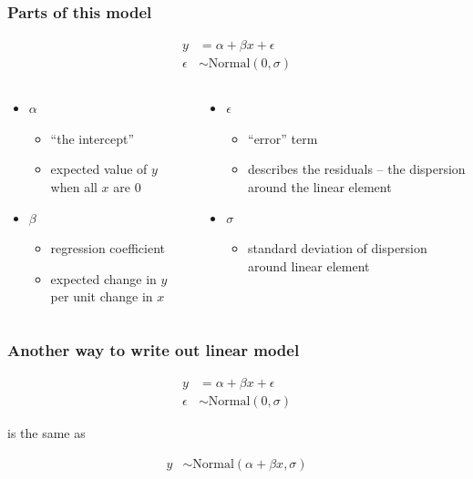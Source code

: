 \documentclass{beamer}
\begin{document}
\begin{frame}
  \frametitle{Parts of this model}

  \begin{align*}
    y &= \alpha + \beta x + \epsilon \\
    \epsilon &\sim \text{Normal}(0, \sigma)
  \end{align*}

  \begin{columns}
    \begin{column}{0.5\textwidth}
      \begin{itemize}
        \item \(\alpha\)
          \begin{itemize}
            \item ``the intercept''
            \item expected value of \(y\) when all \(x\) are 0
          \end{itemize}
        \item \(\beta\)
          \begin{itemize}
            \item regression coefficient 
            \item expected change in \(y\) per unit change in \(x\)
          \end{itemize}
      \end{itemize}
    \end{column}
    \begin{column}{0.5\textwidth}
      \begin{itemize}
        \item \(\epsilon\)
          \begin{itemize}
            \item ``error'' term
            \item describes the residuals -- the dispersion around the linear element
          \end{itemize}
        \item \(\sigma\)
          \begin{itemize}
            \item standard deviation of dispersion around linear element
          \end{itemize}
      \end{itemize}
    \end{column}
  \end{columns}
\end{frame}

\begin{frame}
  \frametitle{Another way to write out linear model}
  \begin{align*}
    y &= \alpha + \beta x + \epsilon \\
    \epsilon &\sim \text{Normal}(0, \sigma)
  \end{align*}

  \begin{center}
    is the same as
  \end{center}

  \begin{align*}
    y &\sim \text{Normal}(\alpha + \beta x, \sigma)
  \end{align*}
\end{frame}
\end{document}
